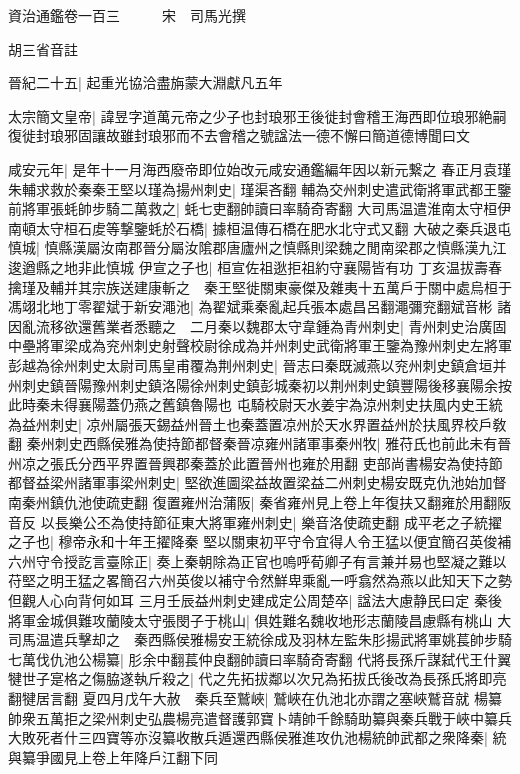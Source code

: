 資治通鑑卷一百三　　　宋　司馬光撰

胡三省音註

晉紀二十五|{
	起重光協洽盡旃蒙大淵獻凡五年}


太宗簡文皇帝|{
	諱昱字道萬元帝之少子也封琅邪王後徙封會稽王海西即位琅邪絶嗣復徙封琅邪固讓故雖封琅邪而不去會稽之號諡法一德不懈曰簡道德博聞曰文}


咸安元年|{
	是年十一月海西廢帝即位始改元咸安通鑑編年因以新元繋之}
春正月袁瑾朱輔求救於秦秦王堅以瑾為揚州刺史|{
	瑾渠吝翻}
輔為交州刺史遣武衛將軍武都王鑒前將軍張蚝帥步騎二萬救之|{
	蚝七吏翻帥讀曰率騎奇寄翻}
大司馬温遣淮南太守桓伊南頓太守桓石䖍等撃鑒蚝於石橋|{
	據桓温傳石橋在肥水北守式又翻}
大破之秦兵退屯慎城|{
	慎縣漢屬汝南郡晉分屬汝隂郡唐廬州之慎縣則梁魏之閒南梁郡之慎縣漢九江逡遒縣之地非此慎城}
伊宣之子也|{
	桓宣佐祖逖拒祖約守襄陽皆有功}
丁亥温拔壽春擒瑾及輔并其宗族送建康斬之　秦王堅徙關東豪傑及雜夷十五萬戶于關中處烏桓于馮翊北地丁零翟斌于新安澠池|{
	為翟斌乘秦亂起兵張本處昌呂翻澠彌兖翻斌音彬}
諸因亂流移欲還舊業者悉聽之　二月秦以魏郡太守韋鍾為青州刺史|{
	青州刺史治廣固}
中壘將軍梁成為兖州刺史射聲校尉徐成為并州刺史武衛將軍王鑒為豫州刺史左將軍彭越為徐州刺史太尉司馬皇甫覆為荆州刺史|{
	晉志曰秦既滅燕以兖州刺史鎮倉垣并州刺史鎮晉陽豫州刺史鎮洛陽徐州刺史鎮彭城秦初以荆州刺史鎮豐陽後移襄陽余按此時秦未得襄陽蓋仍燕之舊鎮魯陽也}
屯騎校尉天水姜宇為涼州刺史扶風内史王統為益州刺史|{
	凉州屬張天錫益州晉土也秦蓋置凉州於天水界置益州於扶風界校戶敎翻}
秦州刺史西縣侯雅為使持節都督秦晉凉雍州諸軍事秦州牧|{
	雅苻氏也前此未有晉州凉之張氏分西平界置晉興郡秦蓋於此置晉州也雍於用翻}
吏部尚書楊安為使持節都督益梁州諸軍事梁州刺史|{
	堅欲進圖梁益故置梁益二州刺史楊安既克仇池始加督南秦州鎮仇池使疏吏翻}
復置雍州治蒲阪|{
	秦省雍州見上卷上年復扶又翻雍於用翻阪音反}
以長樂公丕為使持節征東大將軍雍州刺史|{
	樂音洛使疏吏翻}
成平老之子統擢之子也|{
	穆帝永和十年王擢降秦}
堅以關東初平守令宜得人令王猛以便宜簡召英俊補六州守令授訖言臺除正|{
	奏上秦朝除為正官也嗚呼荀卿子有言兼并易也堅凝之難以苻堅之明王猛之畧簡召六州英俊以補守令然鮮卑乘亂一呼翕然為燕以此知天下之勢但觀人心向背何如耳}
三月壬辰益州刺史建成定公周楚卒|{
	諡法大慮静民曰定}
秦後將軍金城俱難攻蘭陵太守張閔子于桃山|{
	俱姓難名魏收地形志蘭陵昌慮縣有桃山}
大司馬温遣兵擊却之　秦西縣侯雅楊安王統徐成及羽林左監朱肜揚武將軍姚萇帥步騎七萬伐仇池公楊纂|{
	肜余中翻萇仲良翻帥讀曰率騎奇寄翻}
代將長孫斤謀弑代王什翼犍世子寔格之傷脇遂執斤殺之|{
	代之先拓拔鄰以次兄為拓拔氏後改為長孫氏將即亮翻犍居言翻}
夏四月戊午大赦　秦兵至鷲峽|{
	鷲峽在仇池北亦謂之塞峽鷲音就}
楊纂帥衆五萬拒之梁州刺史弘農楊亮遣督護郭寶卜靖帥千餘騎助纂與秦兵戰于峽中纂兵大敗死者什三四寶等亦沒纂收散兵遁還西縣侯雅進攻仇池楊統帥武都之衆降秦|{
	統與纂爭國見上卷上年降戶江翻下同}
